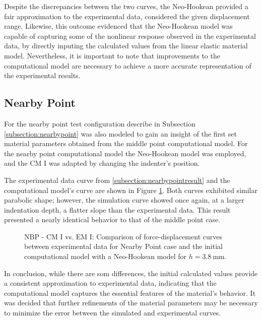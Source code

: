 Despite the discrepancies between the two curves, the Neo-Hookean provided a fair approximation to the experimental data, considered the 
given displacement range. Likewise, this outcome evidenced that the Neo-Hookean model was capable of capturing some of the nonlinear 
response observed in the experimental data, by directly inputing the calculated values from the linear elastic material model.
Nevertheless, it is important to note that improvements to the computational model are necessary to achieve a more
accurate representation of the experimental results.

\subsection{Nearby Point}
For the nearby point test configuration describe in Subsection \ref{subsection:nearbypoint} was also modeled to gain an insight 
of the first set material parameters obtained from the middle point computational model.
For the nearby point computational model the Neo-Hookean model was employed, and the CM I was adapted by changing the 
indenter's position.

The experimental data curve from \ref{subsection:nearbypointresult} and the computational model's curve are shown in Figure 
\ref{fig:nbpointIvsCPINBNH}. Both curves exhibited similar parabolic shape; however, the simulation curve showed once again,
at a larger indentation depth, a flatter slope than the experimental data. This result presented a 
nearly identical behavior to that of the middle point case.\\
\label{subsection:nbpcpI}
\begin{figure}%
    \centering
   \quad
   \caption[Nearby Point: Computational model I vs. Experimental data - Neo-Hookean]{NBP - CM I vs. EM I: Comparison of force-displacement curves between experimental data for Nearby Point case and the initial computational model with a Neo-Hookean model for $h = \SI{3.8}{\milli \meter}$.}%
   \label{fig:nbpointIvsCPINBNH}%
\end{figure}
In conclusion, while there are som differences, the initial calculated values provide a consistent approximation to experimental
data, indicating that the computational model captures the essential features of the material's behavior.
It was decided that further refinements of the material parameters may be necessary to minimize the error between the 
simulated and experimental curves.

